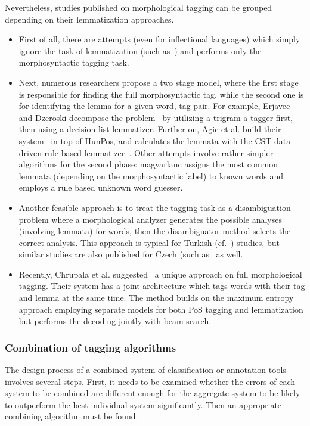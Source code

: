 Nevertheless, studies published on morphological tagging can be grouped depending on their lemmatization approaches.

\begin{itemize}
  \item First of all, there are attempts (even for inflectional languages) which simply ignore the task of lemmatization (such as~\cite{Hajic,Tufis(román),FinnHunPosos}) and performs only the morphosyntactic tagging task. 
  \item Next, numerous researchers propose a two stage model, where the first stage is responsible for finding the full morphosyntactic tag, while the second one is for identifying the lemma for a given word, tag pair.
For example, Erjavec and Dzeroski decompose the problem~\cite{} by utilizing a trigram a tagger first, then using a decision list lemmatizer.
Further on, Agic et al. build their system~\cite{} in top of HunPos, and calculates the lemmata with the CST data-driven rule-based lemmatizer~\cite{}.
Other attempts involve rather simpler algorithms for the second phase: magyarlanc assigns the most common lemmata (depending on the morphosyntactic label) to known words and employs a rule based unknown word guesser.
  \item Another feasible approach is to treat the tagging task as a disambiguation problem where a morphological analyzer generates the possible analyses (involving lemmata) for words, then the disambiguator method selects the correct analysis.
This approach is typical for Turkish (cf.~\cite{török_cikkek}) studies, but similar studies are also published for Czech (such as~\cite{valamelyikHajic} as well.
  \item Recently, Chrupala et al. suggested~\cite{} a unique approach on full morphological tagging.
Their system has a joint architecture which tags words with their tag and lemma at the same time.
The method builds on the maximum entropy approach employing separate models for both PoS tagging and lemmatization but performs the decoding jointly with beam search.
\end{itemize}
\subsubsection{Combination of tagging algorithms}

The design process of a combined system of classification or annotation tools involves several steps.
First, it needs to be examined whether the errors of each system to be combined are different enough for the aggregate system to be likely to outperform the best individual system significantly.
Then an appropriate combining algorithm must be found.

